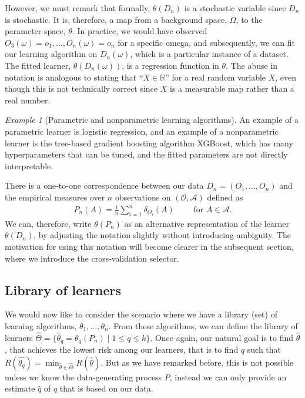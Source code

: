 \documentclass[11pt, a4paper]{article}
\theoremstyle{definition}
\theoremstyle{remark}
\newtheorem{example}{Example}
\newcommand{\q}{q}
\newcommand{\ml}{k}
\newcommand{\btheta}{\theta}
\newcommand{\lib}{\hat{\Theta}}
\begin{document}
However, we must remark that formally, $ \btheta(D_n) $ is a stochastic variable since $ D_n $ is stochastic. It is, therefore, a map from a background space, $ \Omega $, to the parameter space, $ \btheta $. In practice, we would have observed $ O_3(\omega) = o_1, \dots, O_n(\omega) = o_n $ for a specific omega, and subsequently, we can fit our learning algorithm on $ D_n(\omega) $, which is a particular instance of a dataset. The fitted learner, $ \btheta(D_n(\omega)) $, is a regression function in $ \btheta $. The abuse in notation is analogous to stating that ``$ X \in \mathbb{R} $'' for a real random variable $ X $, even though this is not technically correct since $ X $ is a measurable map rather than a real number.
\begin{example}[Parametric and nonparametric learning algorithms]
    An example of a parametric learner is logistic regression, and an example of a nonparametric learner is the tree-based gradient boosting algorithm XGBoost, which has many hyperparameters that can be tuned, and the fitted parameters are not directly interpretable.  
\end{example}
There is a one-to-one correspondence between our data $ D_n = (O_1 , \ldots, O_n) $ and the empirical measures over $ n $ observations on $ (\mathcal{O} , \mathcal{A}) $ defined as
\begin{align*}
    P_n(A) = \frac{1}{n} \sum_{i = 1}^{n} \delta_{O_i}(A)\qquad \text{ for } A \in \mathcal{A}.
\end{align*}
We can, therefore, write $ \btheta(P_n)$ as an alternative representation of the learner $\btheta(D_n)$, by adjusting the notation slightly without introducing ambiguity. The motivation for using this notation will become clearer in the subsequent section, where we introduce the cross-validation selector.

\subsection{Library of learners}
We would now like to consider the scenario where we have a library (set) of learning algorithms, $ \btheta_1 , \ldots, \btheta_n $. From these algorithms, we can define the library of learners $ \lib = \{ \hat{\btheta}_\q = \btheta_{\q}(P_n) \mid 1 \leq \q \leq \ml \} $. Once again, our natural goal is to find $ \hat{\btheta} $, that achieves the lowest risk among our learners, that is to find $ \q $ such that $ R( \hat{\btheta_{\q}} ) = \min_{ \hat{\btheta}  \in \hat{\Theta} } R( \hat{\btheta} ) $. But as we have remarked before, this is not possible unless we know the data-generating process $ P $, instead we can only provide an estimate $ \hat{\q} $ of $ q $ that is based on our data.
\end{document}
